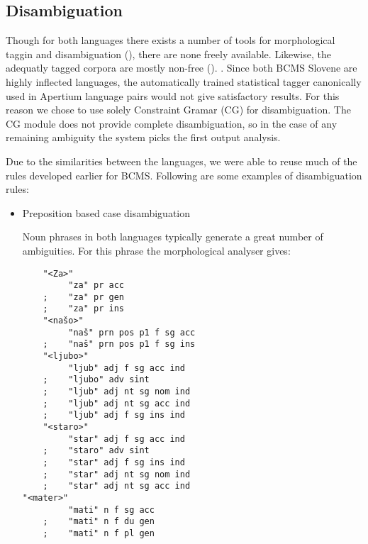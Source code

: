\subsection{Disambiguation}
Though for both languages there exists a number of tools for
morphological taggin and disambiguation (), there
are none freely available. Likewise, the adequatly tagged corpora are
mostly non-free (). .  Since both BCMS Slovene are
highly inflected languages, the automatically trained statistical
tagger canonically used in Apertium language pairs would not give
satisfactory results. For this reason we chose to use solely
Constraint Gramar (CG) for disambiguation. The CG module does not
provide complete disambiguation, so in the case of any remaining
ambiguity the system picks the first output analysis.

Due to the similarities between the languages, we were able to
reuse much of the rules developed earlier for BCMS. Following are
some examples of disambiguation rules:

\begin{itemize}
\item Preposition based case disambiguation


Noun phrases in both languages typically generate a great number of
ambiguities. For this phrase the morphological analyser gives:

{\small
\begin{Verbatim}
    "<Za>"
         "za" pr acc 
    ;    "za" pr gen
    ;    "za" pr ins
    "<našo>"
         "naš" prn pos p1 f sg acc 
    ;    "naš" prn pos p1 f sg ins
    "<ljubo>"
         "ljub" adj f sg acc ind 
    ;    "ljubo" adv sint
    ;    "ljub" adj nt sg nom ind
    ;    "ljub" adj nt sg acc ind
    ;    "ljub" adj f sg ins ind
    "<staro>"
         "star" adj f sg acc ind 
    ;    "staro" adv sint
    ;    "star" adj f sg ins ind
    ;    "star" adj nt sg nom ind
    ;    "star" adj nt sg acc ind
"<mater>"
         "mati" n f sg acc 
    ;    "mati" n f du gen
    ;    "mati" n f pl gen
\end{Verbatim} 
}


\end{itemize}

